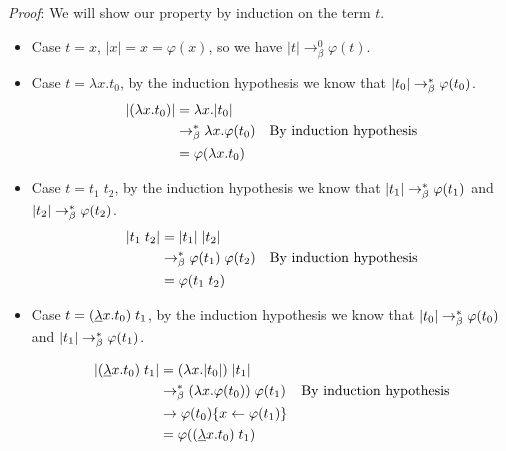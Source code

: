   \begin{center}
  \end{center}
  \textit{Proof}: We will show our property by induction on the term $t$.
  \begin{itemize}
    \item Case $t = x$, $|x| = x = \varphi(x)$, so we have $|t| \to_\beta^0
      \varphi(t)$.
    \item Case $t = \lambda x. t_0$, by the induction hypothesis we know that
      $|t_0| \to_\beta^* \varphi(t_0)$.
      \begin{align*}
        |(\lambda x. t_0)| &= \lambda x. |t_0| \\
        &\to_\beta^* \lambda x. \varphi(t_0) & \text{By induction hypothesis} \\
        &= \varphi(\lambda x. t_0)
      \end{align*}

    \item Case $t = t_1\; t_2$, by the induction hypothesis we know that
      $|t_1| \to_\beta^* \varphi(t_1)$ and $|t_2| \to_\beta^* \varphi(t_2)$.
      \begin{align*}
        |t_1\;t_2| &= |t_1|\;|t_2| \\
        &\to_\beta^* \varphi(t_1)\;\varphi(t_2) & \text{By induction hypothesis} \\
        &= \varphi(t_1\;t_2)
      \end{align*}

    \item Case $t=({\underline \lambda} x. t_0)\;t_1$, by the induction hypothesis we know that
      $|t_0| \to_\beta^* \varphi(t_0)$ and $|t_1| \to_\beta^* \varphi(t_1)$.

        \begin{align*}
          |({\underline \lambda} x. t_0)\;t_1| &= (\lambda x. |t_0|)\;|t_1| \\
            &\to_\beta^* (\lambda x. \varphi(t_0))\;\varphi(t_1) & \text{By
            induction hypothesis}\\
            &\to \varphi(t_0)\{x \leftarrow \varphi(t_1)\} \\
            &=\varphi(({\underline \lambda} x. t_0)\;t_1)
        \end{align*}

  \end{itemize}

